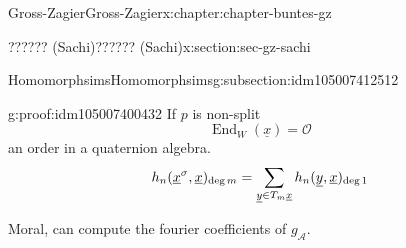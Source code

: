 \documentclass[oneside,10pt,]{book}
\newcommand{\qedhere}{\relax}
\numberwithin{equation}{section}
\newcommand{\ints}{\mathcal{O}}
\DeclareMathOperator{\End}{End}
\begin{document}
\begin{chapterptx}{Gross-Zagier}{}{Gross-Zagier}{}{}{x:chapter:chapter-buntes-gz}
\begin{sectionptx}{?????? (Sachi)}{}{?????? (Sachi)}{}{}{x:section:sec-gz-sachi}
\begin{subsectionptx}{Homomorphsims}{}{Homomorphsims}{}{}{g:subsection:idm105007412512}
\begin{proofptx}{}{g:proof:idm105007400432}
If \(p\) is non-split%
\begin{equation*}
\End_W(\underline x) = \ints
\end{equation*}
an order in a quaternion algebra.%
\begin{equation*}
h_n(\underline x^\sigma , \underline x) _{\deg m} = \sum_{\underline y\in T_m \underline x} h_n(\underline y, \underline x)_{\deg 1}\qedhere
\end{equation*}
%
\end{proofptx}
Moral, can compute the fourier coefficients of \(g_{\mathcal A}\).%
\end{subsectionptx}
\end{sectionptx}
\end{chapterptx}
%
\backmatter
%
%
%
%
%
\typeout{************************************************}
\typeout{************************************************}
%
\end{document}
